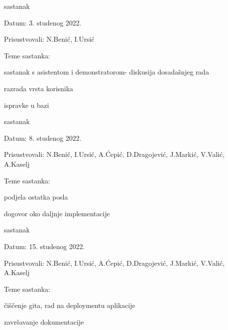 \begin{packed_enum}
					\item  sastanak
				\item[] \begin{packed_item}
					\item Datum: 3. studenog 2022.
					\item Prisustvovali: N.Benić, I.Ursić
					\item Teme sastanka:
					\begin{packed_item}
						\item  sastanak s asistentom i demonstratorom- diskusija dosadašnjeg rada
						\item  razrada vrsta korisnika
							\item ispravke u bazi
					\end{packed_item}
				\end{packed_item}
	
					\item  sastanak
				\item[] \begin{packed_item}
					\item Datum: 8. studenog 2022.
					\item Prisustvovali: N.Benić, I.Ursić, A.Ćepić, D.Dragojević, J.Markić, V.Valić, A.Kaselj 
					\item Teme sastanka:
					\begin{packed_item}
						\item podjela ostatka posla
						\item  dogovor oko daljnje implementacije
					\end{packed_item}
				\end{packed_item}
	
					\eject
	
					\item  sastanak
				\item[] \begin{packed_item}
					\item Datum: 15. studenog 2022.
					\item Prisustvovali: N.Benić, I.Ursić, A.Ćepić, D.Dragojević, J.Markić, V.Valić, A.Kaselj 
					\item Teme sastanka:
					\begin{packed_item}
						\item čiščenje gita, rad na deploymentu aplikacije
						\item  završavanje dokumentacije
					\end{packed_item}
				\end{packed_item}
	

\end{packed_enum}
